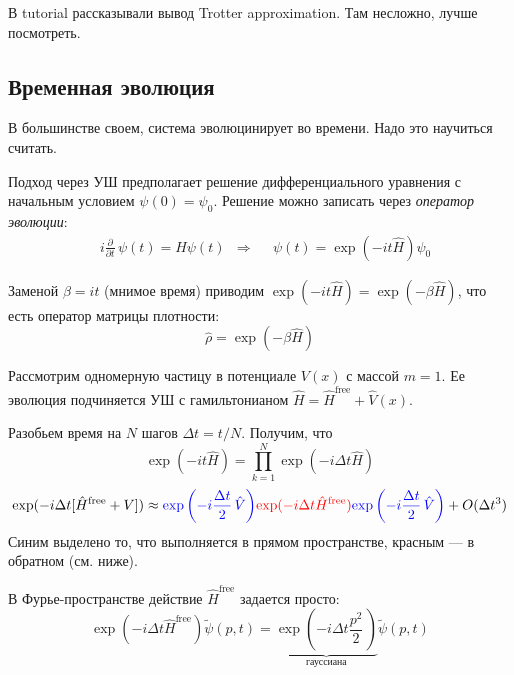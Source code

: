 В tutorial рассказывали вывод Trotter approximation.
Там несложно, лучше посмотреть.

\subsection{Временная эволюция}
В большинстве своем, система эволюцинирует во времени. Надо это научиться считать.

Подход через УШ предполагает решение дифференциального уравнения с начальным условием $\psi (0) = \psi_0$. Решение можно записать через \textit{оператор эволюции}:
\begin{align}
    \label{eq:shroninger-equation_time-dependent}
    & i \frac{\partial}{\partial t}\, \psi (t) = \hat{H} \psi (t) & \Rightarrow &
    & \psi (t) = \exp(-it\hat{H}) \psi_0
\end{align}

Заменой $\beta = it$ (мнимое время) приводим $\exp(-it\hat{H}) = \exp(-\beta \hat{H})$, что есть оператор матрицы плотности:
\begin{equation}
    \label{eq:rho-via-hamiltonian}
    \hat{\rho} = \exp(-\beta \hat{H})
\end{equation}

Рассмотрим одномерную частицу в потенциале $V(x)$ с массой $m=1$.
Ее эволюция подчиняется УШ с гамильтонианом $\hat{H} = \hat{H}^{\text{free}} + \hat{V}(x)$.

Разобьем время на $N$ шагов $\Delta t = t / N$.
Получим, что
\begin{equation}
    \label{eq:evolution-operator-delta-t}
    \exp(-it\hat{H}) = \prod_{k=1}^N \exp(-i\Delta t \hat{H})
\end{equation}
\begin{equation}
    \label{eq:evolution-operator-delta-t-trotter}
    \exp(-i\Delta t [\hat{H}^{\text{free}} + V]) \approx
    {\color{blue} \exp\left( -i \frac{\Delta t}{2}\,\hat{V} \right)}
    {\color{red} \exp(-i\Delta t \hat{H}^{\text{free}})} 
    {\color{blue} \exp\left( -i \frac{\Delta t}{2}\,\hat{V} \right)}
    + O(\Delta t^3)
\end{equation}
Синим выделено то, что выполняется в прямом пространстве, красным --- в обратном (см. ниже).

В Фурье-пространстве действие $\hat{H}^{\text{free}}$ задается просто:
\begin{equation}
    \label{eq:evolution-free_fourier-space}
    \exp(-i \Delta t \hat{H}^{\text{free}}) \tilde \psi (p, t) = \underbrace{\exp\left( -i \Delta t \frac{p^2}{2}\, \right)}_\text{гауссиана} \tilde \psi (p, t) 
\end{equation}

